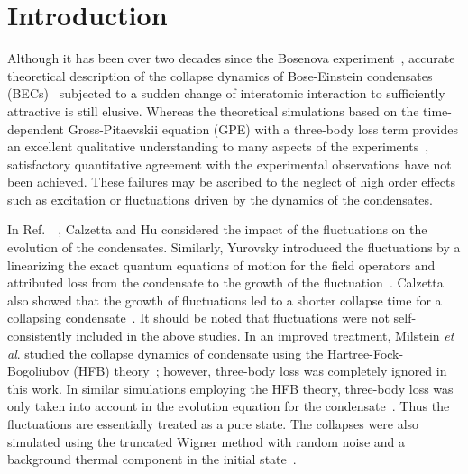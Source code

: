 \documentclass[pra,twocolumn,preprintnumbers,superscriptaddress,longbibliography,showkeys]{revtex4-1}
\begin{document}
\section{I\lowercase{ntroduction}}
Although it has been over two decades since the Bosenova experiment~\cite{CllRb1}, accurate theoretical description of the collapse dynamics of Bose-Einstein condensates (BECs)~\cite{CllRb2, CllRb3, 3loss} subjected to a sudden change of interatomic interaction to sufficiently attractive is still elusive. Whereas the theoretical simulations based on the time-dependent Gross-Pitaevskii equation (GPE) with a three-body loss term provides an excellent qualitative understanding to many aspects of the experiments~\cite{Ueda1, GPE2, Ueda2, GPE4, GPE5, GPE6, GPE7,confinment,3BlGPE}, satisfactory quantitative agreement with the experimental observations have not been achieved. These failures may be ascribed to the neglect of high order effects such as excitation or fluctuations driven by the dynamics of the condensates.

In Ref.~~\cite{addfluc1}, Calzetta and Hu considered the impact of the fluctuations on the evolution of the condensates. Similarly, Yurovsky introduced the fluctuations by a linearizing the exact quantum equations of motion for the field operators and attributed loss from the condensate to the growth of the fluctuation~\cite{addfluc2}. Calzetta also showed that the growth of fluctuations led to a shorter collapse time for a collapsing condensate~\cite{addfluc3}. It should be noted that fluctuations were not self-consistently included in the above studies. In an improved treatment, Milstein {\it et al}. studied the collapse dynamics of condensate using the Hartree-Fock-Bogoliubov (HFB) theory~\cite{HFB1}; however, three-body loss was completely ignored in this work. In similar simulations employing the HFB theory, three-body loss was only taken into account in the evolution equation for the condensate~\cite{HFB2,HFB3,HFB4}. Thus the fluctuations are essentially treated as a pure state. The collapses were also simulated using the truncated Wigner method with random noise and a background thermal component in the initial state~\cite{HFB_TWA,HFB3}.
\end{document}
